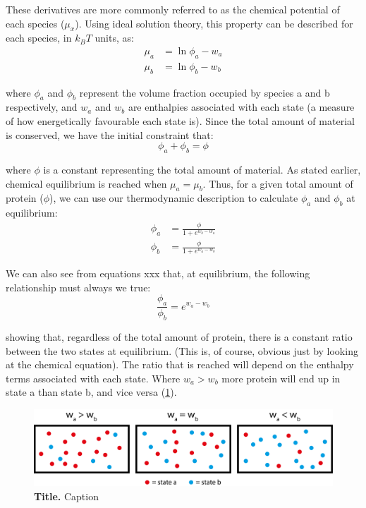 \documentclass[12pt]{"article"}
\newcommand{\mycaption}[2]{\caption[#1]{\textbf{#1.} #2}}
\begin{document}
These derivatives are more commonly referred to as the chemical potential of each species ($\mu_x$). Using ideal solution theory, this property can be described for each species, in $k_BT$ units, as:
\begin{align}
\mu_a &= \ln\phi_a - w_a\\
\mu_b &= \ln\phi_b - w_b
\end{align} 

where $\phi_a$ and $\phi_b$ represent the volume fraction occupied by species a and b respectively, and $w_a$ and $w_b$ are enthalpies associated with each state (a measure of how energetically favourable each state is). Since the total amount of material is conserved, we have the initial constraint that:
\begin{equation}
\phi_a + \phi_b = \phi
\end{equation}

where $\phi$ is a constant representing the total amount of material. As stated earlier, chemical equilibrium is reached when $\mu_a = \mu_b$. Thus, for a given total amount of protein ($\phi$), we can use our thermodynamic description to calculate $\phi_a$ and $\phi_b$ at equilibrium:
\begin{align}
\phi_a &= \frac{\phi}{1 + e^{w_b - w_a}}\\
\phi_b &= \frac{\phi}{1 + e^{w_a - w_b}}
\end{align}

We can also see from equations xxx that, at equilibrium, the following relationship must always we true:
\begin{equation}
\frac{\phi_a}{\phi_b} = e^{w_a - w_b}
\end{equation}

showing that, regardless of the total amount of protein, there is a constant ratio between the two states at equilibrium. (This is, of course, obvious just by looking at the chemical equation). The ratio that is reached will depend on the enthalpy terms associated with each state. Where $w_a > w_b$ more protein will end up in state a than state b, and vice versa (\cref{fig:thermodynamic_simple_example2}).\\

\begin{figure}[!h]
\includegraphics[scale=0.9]{thermodynamic_simple_example2}
\setlength{\abovecaptionskip}{20pt}
\centering
\mycaption{Title}{Caption}
\label{fig:thermodynamic_simple_example2}
\end{figure}
\end{document}
